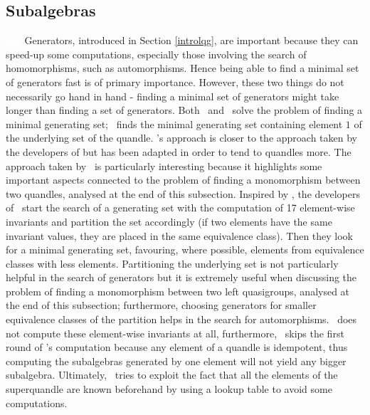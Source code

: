 \documentclass{mcom-l}
\begin{document}
\subsection{Subalgebras}\textcolor{white}{line}
\newline \noindent Generators, introduced in Section \ref{introlqg}, are important because they can speed-up some computations, especially those involving the search of homomorphisms, such as automorphisms. Hence being able to find a minimal set of generators fast is of primary importance. However, these two things do not necessarily go hand in hand - finding a minimal set of generators might take longer than finding a set of generators. Both \rig~and \cream~solve the problem of finding a minimal generating set; \Software~finds the minimal generating set containing element $1$ of the underlying set of the quandle. \newline
\Software's approach is closer to the approach taken by the developers of \cream\newline but has been adapted in order to tend to quandles more.\newline
The approach taken by \cream~is particularly interesting because it highlights some important aspects connected to the problem of finding a monomorphism between two quandles, analysed at the end of this subsection.\newline\newline
Inspired by \cite{nagy2007loops}, the developers of \cream~start the search of a generating set with the computation of 17 element-wise invariants and partition the set accordingly (if two elements have the same invariant values, they are placed in the same equivalence class). Then they look for a minimal generating set, favouring, where possible, elements from equivalence classes with less elements. Partitioning the underlying set is not particularly helpful in the search of generators but it is extremely useful when discussing the problem of finding a monomorphism between two left quasigroups, analysed at the end of this subsection; furthermore, choosing generators for smaller equivalence classes of the partition helps in the search for automorphisms.\newline
\Software~does not compute these element-wise invariants at all, furthermore, \Software~skips the first round of \cream's computation because any element of a quandle is idempotent, thus computing the subalgebras generated by one element will not yield any bigger subalgebra. Ultimately, \Software~tries to exploit the fact that all the elements of the superquandle are known beforehand by using a lookup table to avoid some computations.
\end{document}
